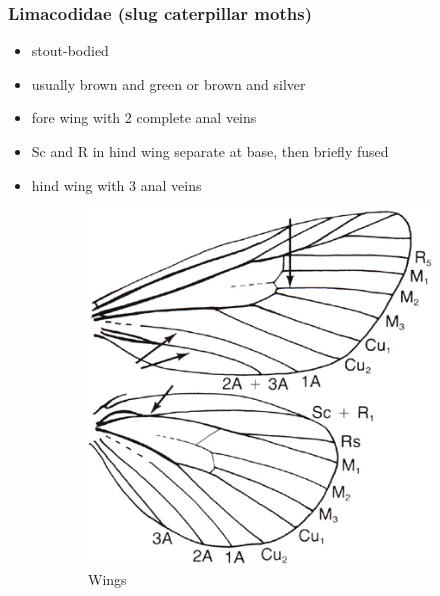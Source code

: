 \documentclass[letterpaper, 11pt]{article}
\begin{document}
\subsubsection{Limacodidae (slug caterpillar moths)}
\begin{itemize}
\item stout-bodied
\item usually brown and green or brown and silver
\item fore wing with 2 complete anal veins
\item Sc and R in hind wing separate at base, then briefly fused 
\item hind wing with 3 anal veins
\end{itemize}

\begin{figure}[ht!]
    \centering
    \begin{subfigure}[ht!]{0.38\textwidth}
        \includegraphics[width=\textwidth]{image48}
        \caption{Wings}
        \label{fig:limacodid1}
    \end{subfigure}
    \qquad %
    \begin{subfigure}[ht!]{0.48\textwidth}

\end{subfigure}
\end{figure}
\end{document}
